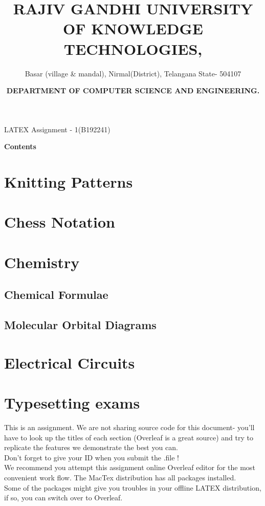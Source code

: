 \documentclass{knittingpattern}
\title{\color{blue}\centering\large\textbf{RAJIV GANDHI UNIVERSITY OF KNOWLEDGE TECHNOLOGIES,}}
\author{\color{blue}\centering\normalsize Basar (village \& mandal), Nirmal(District), Telangana State- 504107 }
\date{ \color{red}\centering \large \textbf{DEPARTMENT OF COMPUTER SCIENCE AND ENGINEERING.}}
\begin{document}
\maketitle
\hline
\vspace{0.5 cm}
\centering
\large{LATEX Assignment - 1(B192241)}
\\
\begin{flushleft}
\Large\textbf{Contents}
\section{Knitting Patterns}
\section{Chess Notation}
\section{Chemistry}
\subsection{Chemical Formulae}
\subsection{Molecular Orbital Diagrams}
\section{Electrical Circuits}
\section{Typesetting exams}
\end{flushleft}
\raggedright
This is an assignment. We are not sharing source code for this document- you'll have to look up the titles of each section (Overleaf is a great source) and try to replicate the features we demonstrate the best you can.\\
\medskip
Don't forget to give your ID when you submit the .file !\\
\medskip
We recommend you attempt this assignment online Overleaf editor for the most convenient work flow. The MacTex distribution has all packages installed.\\
\medskip
Some of the packages might give you troubles in your offline LATEX distribution, if so, you can switch over to Overleaf.\\
\bigskip
\bigskip
\centering
{}
\newpage
{}
\end{document}
